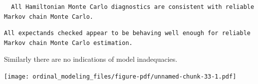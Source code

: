\documentclass[
  letterpaper,
  DIV=11,
  numbers=noendperiod]{scrartcl}
\newenvironment{Shaded}{\begin{snugshade}}{\end{snugshade}}
\newcommand{\AttributeTok}[1]{\textcolor[rgb]{0.40,0.45,0.13}{#1}}
\newcommand{\ConstantTok}[1]{\textcolor[rgb]{0.56,0.35,0.01}{#1}}
\newcommand{\DecValTok}[1]{\textcolor[rgb]{0.68,0.00,0.00}{#1}}
\newcommand{\FloatTok}[1]{\textcolor[rgb]{0.68,0.00,0.00}{#1}}
\newcommand{\FunctionTok}[1]{\textcolor[rgb]{0.28,0.35,0.67}{#1}}
\newcommand{\NormalTok}[1]{\textcolor[rgb]{0.00,0.23,0.31}{#1}}
\newcommand{\OtherTok}[1]{\textcolor[rgb]{0.00,0.23,0.31}{#1}}
\newcommand{\SpecialCharTok}[1]{\textcolor[rgb]{0.37,0.37,0.37}{#1}}
\newcommand{\StringTok}[1]{\textcolor[rgb]{0.13,0.47,0.30}{#1}}
\begin{document}
\begin{verbatim}
  All Hamiltonian Monte Carlo diagnostics are consistent with reliable
Markov chain Monte Carlo.
\end{verbatim}

\begin{Shaded}
\end{Shaded}

\begin{verbatim}
All expectands checked appear to be behaving well enough for reliable
Markov chain Monte Carlo estimation.
\end{verbatim}

Similarly there are no indications of model inadequacies.

\begin{Shaded}
\end{Shaded}

\texttt{[image: ordinal\_modeling\_files/figure-pdf/unnamed-chunk-33-1.pdf]}
\end{document}
